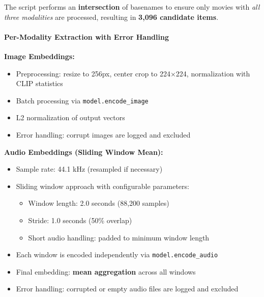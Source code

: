 The script performs an \textbf{intersection} of basenames to ensure only movies with \textit{all three modalities} are processed, resulting in \textbf{3,096 candidate items}.

\paragraph{Per-Modality Extraction with Error Handling}

\textbf{Image Embeddings:}
\begin{itemize}
    \item Preprocessing: resize to 256px, center crop to 224×224, normalization with CLIP statistics
    \item Batch processing via \texttt{model.encode\_image}
    \item L2 normalization of output vectors
    \item Error handling: corrupt images are logged and excluded
\end{itemize}

\textbf{Audio Embeddings (Sliding Window Mean):}
\begin{itemize}
    \item Sample rate: 44.1 kHz (resampled if necessary)
    \item Sliding window approach with configurable parameters:
    \begin{itemize}
        \item Window length: 2.0 seconds (88,200 samples)
        \item Stride: 1.0 seconds (50\% overlap)
        \item Short audio handling: padded to minimum window length
    \end{itemize}
    \item Each window is encoded independently via \texttt{model.encode\_audio}
    \item Final embedding: \textbf{mean aggregation} across all windows
    \item Error handling: corrupted or empty audio files are logged and excluded
\end{itemize}

